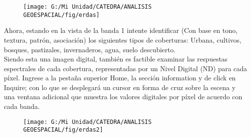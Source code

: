 \documentclass[a4paper,oneside,11pt,]{article}
\begin{document}
\begin{figure}
\centering
\texttt{[image: G:/Mi Unidad/CATEDRA/ANALISIS GEOESPACIAL/fig/erdas]}
\end{figure}

Ahora, estando en la vista de la banda 1 intente identificar (Con base en tono, textura, patrón, asociación) los siguientes tipos de coberturas: Urbana, cultivos, bosques, pastizales, invernaderos, agua, suelo descubierto.\\

Siendo esta una imagen digital, también es factible examinar las respuestas espectrales de cada cobertura, representadas  por un Nivel Digital (ND) para cada píxel. Ingrese a la pestaña superior Home, la sección information y de click en Inquire; con lo que se desplegará un cursor en forma de cruz sobre la escena y una ventana adicional que muestra los valores digitales por píxel de acuerdo con cada banda. 

\begin{figure}
\centering
\texttt{[image: G:/Mi Unidad/CATEDRA/ANALISIS GEOESPACIAL/fig/erdas2]}
\end{figure}
\end{document}

